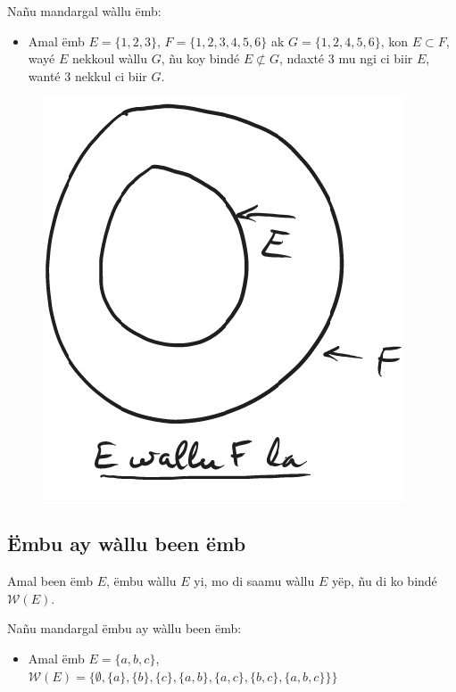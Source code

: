 \documentclass[twoside, a4paper]{article}
\begin{document}
Nañu mandargal wàllu ëmb:
\begin{itemize}
    \item Amal ëmb $E=\{1,2,3\}$, $F=\{1,2,3,4,5,6\}$ ak $G = \{1,2,4,5,6\}$, kon $E \subset F$, wayé $E$ nekkoul wàllu $G$, ñu koy bindé $E\not\subset G$, ndaxté $3$ mu ngi ci biir $E$, wanté $3$ nekkul ci biir $G$.
\end{itemize}
\begin{figure}[ht]
    \centering
    \includegraphics[scale = 0.5]{image/wallu_emb.png}
    \label{fig:wallu_emb}
\end{figure}


\subsection{Ëmbu ay wàllu been ëmb}
\begin{tcolorbox}[enhanced jigsaw,breakable,pad at break*=1mm,
    colback=red!5!white,colframe=white!75!black,title= Téeki,
    watermark color=white]
  Amal been ëmb $E$, ëmbu wàllu $E$ yi, mo di saamu wàllu $E$ yëp, ñu di ko bindé $\mathcal{W}(E)$. 
\end{tcolorbox}

Nañu mandargal ëmbu ay wàllu been ëmb:
\begin{itemize}
    \item Amal ëmb $E=\{a,b,c\}$, $\mathcal{W}(E) = \big\{\emptyset, \{a\}, \{b\}, \{c\}, \{a,b\}, \{a,c\}, \{b,c\}, \{a,b,c\}\}\big\}$ 
\end{itemize}
\end{document}
